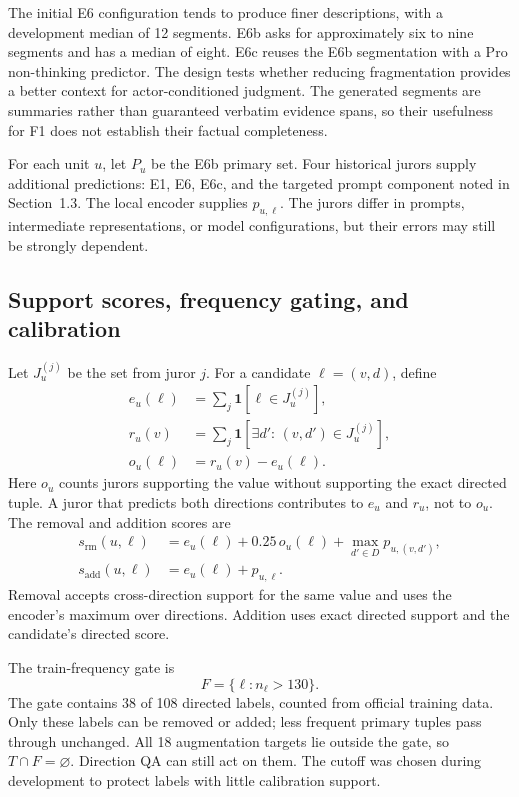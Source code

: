 \documentclass[12pt,a4paper]{article}
\begin{document}
The initial E6 configuration tends to produce finer descriptions, with a development median of 12 segments. E6b asks for approximately six to nine segments and has a median of eight. E6c reuses the E6b segmentation with a Pro non-thinking predictor. The design tests whether reducing fragmentation provides a better context for actor-conditioned judgment. The generated segments are summaries rather than guaranteed verbatim evidence spans, so their usefulness for F1 does not establish their factual completeness.

For each unit $u$, let $P_u$ be the E6b primary set. Four historical jurors supply additional predictions: E1, E6, E6c, and the targeted prompt component noted in Section~1.3. The local encoder supplies $p_{u,\ell}$. The jurors differ in prompts, intermediate representations, or model configurations, but their errors may still be strongly dependent.

\subsection{Support scores, frequency gating, and calibration}
Let $J_u^{(j)}$ be the set from juror $j$. For a candidate $\ell=(v,d)$, define
\begin{align}
e_u(\ell)&=\sum_j\mathbf{1}[\ell\in J_u^{(j)}],\\
r_u(v)&=\sum_j\mathbf{1}[\exists d'\!:\,(v,d')\in J_u^{(j)}],\\
o_u(\ell)&=r_u(v)-e_u(\ell).
\end{align}
Here $o_u$ counts jurors supporting the value without supporting the exact directed tuple. A juror that predicts both directions contributes to $e_u$ and $r_u$, not to $o_u$. The removal and addition scores are
\begin{align}
s_{\mathrm{rm}}(u,\ell)&=e_u(\ell)+0.25\,o_u(\ell)+\max_{d'\in D}p_{u,(v,d')},\label{eq:removal}\\
s_{\mathrm{add}}(u,\ell)&=e_u(\ell)+p_{u,\ell}.\label{eq:addition}
\end{align}
Removal accepts cross-direction support for the same value and uses the encoder's maximum over directions. Addition uses exact directed support and the candidate's directed score.

The train-frequency gate is
\begin{equation}
F=\{\ell:n_\ell>130\}.
\label{eq:gate}
\end{equation}
The gate contains 38 of 108 directed labels, counted from official training data. Only these labels can be removed or added; less frequent primary tuples pass through unchanged. All 18 augmentation targets lie outside the gate, so $T\cap F=\varnothing$. Direction QA can still act on them. The cutoff was chosen during development to protect labels with little calibration support.
\end{document}
